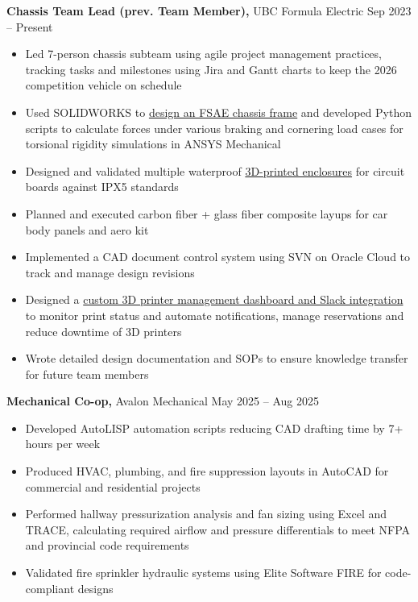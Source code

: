 \documentclass[11pt]{article}       %
\begin{document}
\textbf{Chassis Team Lead \textnormal{(prev. Team Member)},} {UBC Formula Electric} \hfill Sep 2023 -- Present \\
\vspace{-8.5pt}
\begin{itemize}
  \item Led 7-person chassis subteam using agile project management practices, tracking tasks and milestones using Jira and Gantt charts to keep the 2026 competition vehicle on schedule
  \item Used SOLIDWORKS to \href{https://www.danielrbenjamin.com/projects/fsae-chassis/}{design an FSAE chassis frame} and developed Python scripts to calculate forces under various braking and cornering load cases for torsional rigidity simulations in ANSYS Mechanical
  \item Designed and validated multiple waterproof \href{https://www.danielrbenjamin.com/projects/circuit-enclosure/}{3D-printed enclosures} for circuit boards against IPX5 standards
  \item Planned and executed carbon fiber + glass fiber composite layups for car body panels and aero kit
  \item Implemented a CAD document control system using SVN on Oracle Cloud to track and manage design revisions
  \item Designed a \href{https://www.danielrbenjamin.com/projects/danbot/}{custom 3D printer management dashboard and Slack integration} to monitor print status and automate notifications, manage reservations and reduce downtime of 3D printers
  \item Wrote detailed design documentation and SOPs to ensure knowledge transfer for future team members
\end{itemize}

\textbf{Mechanical Co-op,} {Avalon Mechanical} \hfill May 2025 -- Aug 2025 \\
\vspace{-8.5pt}
\begin{itemize}
   \item Developed AutoLISP automation scripts reducing CAD drafting time by 7+ hours per week
  \item Produced HVAC, plumbing, and fire suppression layouts in AutoCAD for commercial and residential projects
  \item Performed hallway pressurization analysis and fan sizing using Excel and TRACE, calculating required airflow and pressure differentials to meet NFPA and provincial code requirements
  \item Validated fire sprinkler hydraulic systems using Elite Software FIRE for code-compliant designs
\end{itemize}
\end{document}
